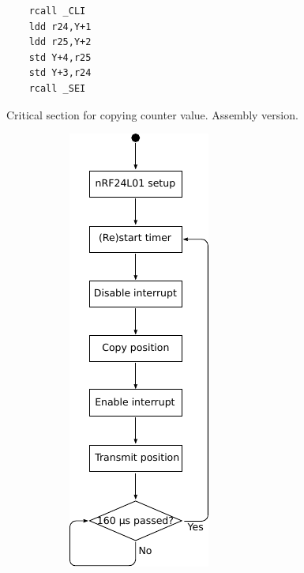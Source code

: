 {\renewcommand\fcolorbox[4][]{\textcolor{cyan}{\strut#4}}
\begin{listing}[h]
\begin{verbatim}
	rcall _CLI
	ldd r24,Y+1
	ldd r25,Y+2
	std Y+4,r25
	std Y+3,r24
	rcall _SEI
\end{verbatim}
\caption{Critical section for copying counter value. Assembly version.}
\label{code:critical_section_asm}
\end{listing}

\begin{figure}[h]
	\centering
	\begin{subfigure}[b]{0.30\textwidth}
		\centering
		\includegraphics[width=.8\linewidth]{graphics/joint_software_diagram}

\end{subfigure}
\end{figure}}
